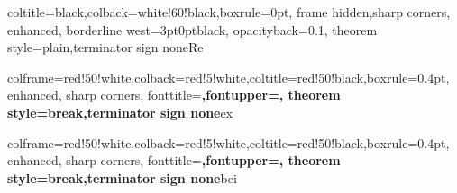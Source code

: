 %
{coltitle=black,colback=white!60!black,boxrule=0pt,
frame hidden,sharp corners, enhanced,
borderline west={3pt}{0pt}{black},
opacityback=0.1,
theorem style=plain,terminator sign none}{Re}

%
{colframe=red!50!white,colback=red!5!white,coltitle=red!50!black,boxrule=0.4pt,
enhanced, sharp corners,
fonttitle=\upshape\bfseries,fontupper=\upshape,
theorem style=break,terminator sign none}{ex}

%
{colframe=red!50!white,colback=red!5!white,coltitle=red!50!black,boxrule=0.4pt,
enhanced, sharp corners,
fonttitle=\upshape\bfseries,fontupper=\upshape,
theorem style=break,terminator sign none}{bei}



\newcommand{\N}{\mathbb{N}}
\newcommand{\Z}{\mathbb{Z}}
\newcommand{\Q}{\mathbb{Q}}
\newcommand{\R}{\mathbb{R}}
\newcommand{\C}{\mathbb{C}}
